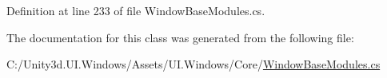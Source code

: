 Definition at line 233 of file Window\+Base\+Modules.\+cs.



The documentation for this class was generated from the following file\+:\begin{DoxyCompactItemize}
\item 
C\+:/\+Unity3d.\+U\+I.\+Windows/\+Assets/\+U\+I.\+Windows/\+Core/\hyperlink{_window_base_modules_8cs}{Window\+Base\+Modules.\+cs}\end{DoxyCompactItemize}
